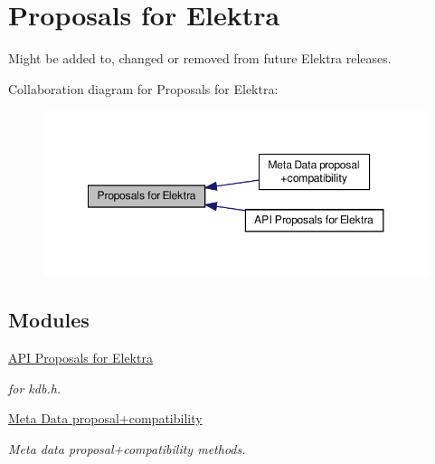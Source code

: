 \hypertarget{group__proposal}{\section{Proposals for Elektra}
\label{group__proposal}
}


Might be added to, changed or removed from future Elektra releases.  


Collaboration diagram for Proposals for Elektra\-:
\nopagebreak
\begin{figure}[H]
\begin{center}
\leavevmode
\includegraphics[width=348pt]{group__proposal}
\end{center}
\end{figure}
\subsection*{Modules}
\begin{DoxyCompactItemize}
\item 
\hyperlink{group__api}{A\-P\-I Proposals for Elektra}
\begin{DoxyCompactList}\small\item\em for kdb.\-h. \end{DoxyCompactList}\item 
\hyperlink{group__meta}{Meta Data proposal+compatibility}
\begin{DoxyCompactList}\small\item\em Meta data proposal+compatibility methods. \end{DoxyCompactList}\end{DoxyCompactItemize}
